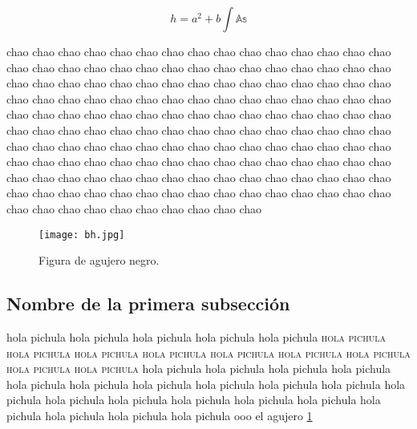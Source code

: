 \begin{equation}
h=a^2+b\int\mathbb{As}
\end{equation}

chao chao chao chao chao chao chao chao chao chao chao chao chao chao chao chao chao chao chao chao chao chao chao chao chao chao chao chao chao chao chao chao chao chao chao chao chao chao chao chao chao chao chao chao chao chao chao chao chao chao chao chao chao chao chao chao chao chao chao chao chao chao chao chao chao chao chao chao chao chao chao chao chao chao chao chao chao chao chao chao chao chao chao chao chao chao chao chao chao chao chao chao chao chao chao chao chao chao chao chao chao chao chao chao chao chao chao chao chao chao chao chao chao chao chao chao chao chao chao chao chao chao chao chao chao chao chao chao chao chao chao chao chao chao chao chao chao chao chao chao chao chao chao chao chao chao chao chao chao chao chao chao chao chao chao chao chao chao chao chao

\begin{figure}[b]
\centering
\texttt{[image: bh.jpg]}
\caption{Figura de agujero negro.}
\label{fig:agujero}
\end{figure}

\subsection{Nombre de la primera subsección}

hola pichula hola pichula hola pichula hola pichula hola pichula \textsc{hola pichula hola pichula hola pichula hola pichula hola pichula hola pichula hola pichula hola pichula hola pichula} hola pichula hola pichula hola pichula hola pichula hola pichula hola pichula hola pichula hola pichula hola pichula hola pichula hola pichula hola pichula hola pichula hola pichula hola pichula hola pichula hola pichula hola pichula hola pichula hola pichula ooo el agujero \ref{fig:agujero}

